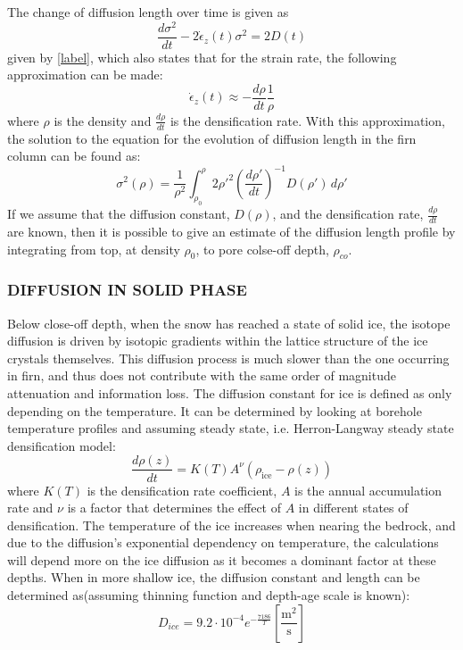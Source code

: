 \documentclass[11pt]{article}
\begin{document}
The change of diffusion length over time is given as 
\begin{equation}
	\frac{d\sigma^2}{dt} - 2\dot{\epsilon}_z (t)\sigma^2 = 2 D(t)
	\label{eq:Evolution_DiffLen}
\end{equation}
given by \ref{label}, which also states that for the strain rate, the following approximation can be made:
\begin{equation}
	\dot{\epsilon}_z(t) \approx - \frac{d\rho}{dt}\frac{1}{\rho}
	\label{eq:strain_rate_approx}
\end{equation}
where $\rho$ is the density and $\frac{d\rho}{dt}$ is the densification rate. With this approximation, the solution to the equation for the evolution of diffusion length in the firn column can be found as:
\begin{equation}
	\sigma^2(\rho) =\frac{1}{\rho^2} \int_{\rho_0}^{\rho}2\rho'^2\left(\frac{d\rho'}{dt}\right)^{-1} D(\rho') \, d\rho'
	\label{eq:Diff_Len_Firn}
\end{equation}
If we assume that the diffusion constant, $D(\rho)$, and the densification rate, $\frac{d\rho}{dt}$ are known, then it is possible to give an estimate of the diffusion length profile by integrating from top, at density $\rho_0$, to pore colse-off depth, $\rho_{co}$.

\subsubsection{DIFFUSION IN SOLID PHASE}
Below close-off depth, when the snow has reached a state of solid ice, the isotope diffusion is driven by isotopic gradients within the lattice structure of the ice crystals themselves. This diffusion process is much slower than the one occurring in firn, and thus does not contribute with the same order of magnitude attenuation and information loss. The diffusion constant for ice is defined as only depending on the temperature. It can be determined by looking at borehole temperature profiles and assuming steady state, i.e. Herron-Langway steady state densification model:
\begin{equation}
	\frac{d\rho(z)}{dt} = K(T) A^{\nu}(\rho_{\text{ice}} -\rho(z))
	\label{eq:HL_Steady_State_Dens_Model}
\end{equation}
where $K(T)$ is the densification rate coefficient, $A$ is the annual accumulation rate and $\nu$ is a factor that determines the effect of $A$ in different states of densification.
The temperature of the ice increases when nearing the bedrock, and due to the diffusion's exponential dependency on temperature, the calculations will depend more on the ice diffusion as it becomes a dominant factor at these depths. When in more shallow ice, the diffusion constant and length can be determined as(assuming thinning function and depth-age scale is known):
\begin{equation}
	D_{ice} = 9.2 \cdot 10^{-4} e^{-\frac{7186}{T}} 	\left[\frac{\text{m}^2}{\text{s}}\right]
	\label{eq:Ice_Diff_const}
\end{equation}
\end{document}
